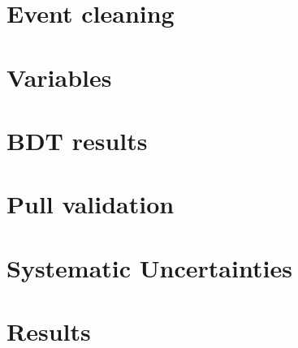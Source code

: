 \section{Event cleaning}
\section{Variables}
\section{BDT results}
\section{Pull validation}
\section{Systematic Uncertainties}

\section{Results}